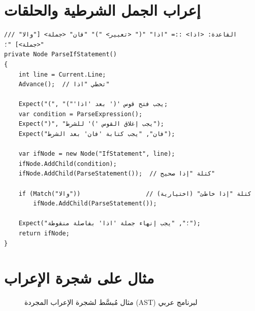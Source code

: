 \documentclass[12pt,a4paper]{report}
\newcommand{\filename}[1]{\textcolor{SecondaryBlue}{\texttt{#1}}}
\begin{document}
\section{إعراب الجمل الشرطية والحلقات}

\begin{CodeBox}[title={\filename{Parser.cs} — إعراب الجملة الشرطية \texttt{اذا...فان...والا}}]
\begin{lstlisting}[style=CSharpStyle]
/// القاعدة: <اذا> ::= "اذا" "(" <تعبير> ")" "فان" <جملة> ["والا" <جملة>] "؛"
private Node ParseIfStatement()
{
    int line = Current.Line;
    Advance();  // تخطي "اذا"

    Expect("(", "يجب فتح قوس '(' بعد 'اذا'");
    var condition = ParseExpression();
    Expect(")", "يجب إغلاق القوس ')' للشرط");
    Expect("فان", "يجب كتابة 'فان' بعد الشرط");

    var ifNode = new Node("IfStatement", line);
    ifNode.AddChild(condition);
    ifNode.AddChild(ParseStatement());  // كتلة "إذا صحيح"

    if (Match("والا"))                  // كتلة "إذا خاطئ" (اختيارية)
        ifNode.AddChild(ParseStatement());

    Expect("؛", "يجب إنهاء جملة 'اذا' بفاصلة منقوطة");
    return ifNode;
}
\end{lstlisting}
\end{CodeBox}

\section{مثال على شجرة الإعراب}

\begin{figure}[H]
\centering
{}
\caption{\arabicfont مثال مُبسَّط لشجرة الإعراب المجردة (AST) لبرنامج عربي}
\label{fig:ast}
\end{figure}
\end{document}
